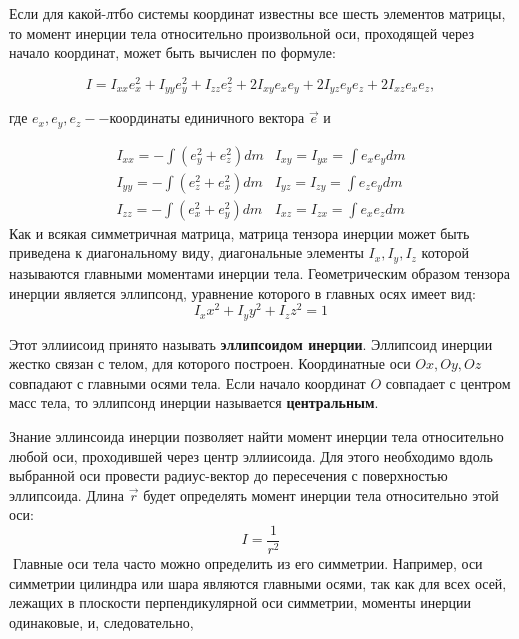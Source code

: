 \documentclass[12pt, a4paper]{article}
\begin{document}
Если для какой-лтбо системы координат известны все шесть элементов матрицы, то момент инерции тела относительно произвольной оси, проходящей через начало координат, может быть вычислен по формуле:

\begin{equation}
	I = I_{xx}e_x^2+I_{yy}e_y^2+I_{zz}e_z^2+2I_{xy}e_xe_y+2I_{yz}e_ye_z+2I_{xz}e_xe_z,
\end{equation}

где $e_x, e_y,e_z -- $координаты единичного вектора $\vec{e}$ и

\begin{equation*}
\begin{matrix}
	I_{xx} = -\int (e_y^2 +e_z^2) dm & I_{xy} = 			I_{yx} = \int e_xe_ydm\\
	I_{yy} = -\int (e_z^2 +e_x^2) dm & I_{yz} = 			I_{zy} = \int e_ze_ydm\\
	I_{zz} = -\int (e_x^2 +e_y^2) dm & I_{xz} = 			I_{zx} = \int e_xe_zdm
	\end{matrix} 
\end{equation*}
	\hspace{0.5cm}Как и всякая симметричная матрица, матрица тензора инерции может быть приведена к диагональному
виду, диагональные элементы $I_x, I_y, I_z$ которой называются главными моментами инерции тела. Геометрическим образом тензора инерции является эллипсонд, уравнение которого в главных осях имеет вид:
\begin{equation}
	I_x x^2 + I_y y^2+ I_z z^2 = 1
\end{equation}

	Этот эллиисоид принято называть \textbf{эллипсоидом инерции}. Эллипсоид инерции жестко связан с телом, для которого построен. Координатные оси $Ox, Oy, Oz$ совпадают с главными осями тела. Если начало
координат $O$ совпадает с центром масс тела, то эллипсонд инерции называется \textbf{центральным}.

	Знание эллинсоида инерции позволяет найти момент инерции тела относительно любой оси, проходившей через центр эллиисоида. Для этого необходимо вдоль выбранной оси провести радиус-вектор  до пересечения с поверхностью эллипсоида. Длина $\vec{r}$ будет определять момент инерции тела относительно этой оси:
\[I = \dfrac{1}{r^2}\]

	Главные оси тела часто можно определить из
его симметрии. Например, оси симметрии цилиндра или шара являются главными осями, так как для всех осей, лежащих в плоскости перпендикулярной оси симметрии, моменты инерции одинаковые, и, следовательно,
\end{document}
